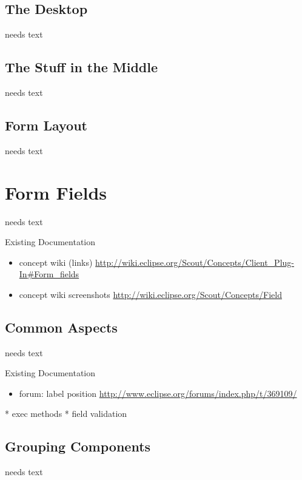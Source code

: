 \documentclass[a4paper,10pt,twoside]{book}
\begin{document}
\section{The Desktop}
needs text

\section{The Stuff in the Middle}
needs text

\section{Form Layout}
needs text

\chapter{Form Fields}

needs text

\noindent Existing Documentation
\begin{itemize}
  \item concept wiki (links) \url{http://wiki.eclipse.org/Scout/Concepts/Client_Plug-In#Form_fields}
  \item concept wiki screenshots \url{http://wiki.eclipse.org/Scout/Concepts/Field}
\end{itemize}

\section{Common Aspects}
needs text

\noindent Existing Documentation
\begin{itemize}
  \item forum: label position \url{http://www.eclipse.org/forums/index.php/t/369109/}
\end{itemize}

* exec methods
* field validation

	
\section{Grouping Components}
needs text
\end{document}
